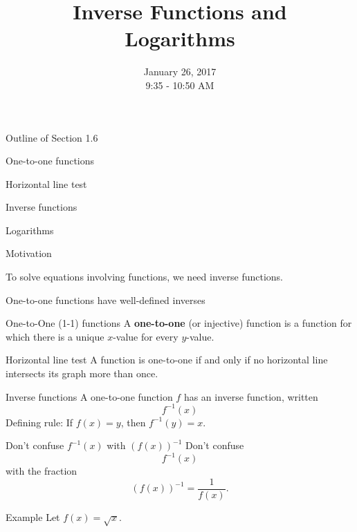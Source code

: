 \documentclass[t]{beamer}
\title{Inverse Functions and \\
Logarithms}
\date{January 26, 2017 \\ 9:35 - 10:50 AM}
\newenvironment{fpi}
  {\itemize[nolistsep,itemsep=\fill]}
  {\vfill\enditemize}
\begin{document}
\frame{\titlepage}


\begin{frame}{Outline of Section 1.6}
\begin{fpi}
\item One-to-one functions
\item Horizontal line test
\item Inverse functions
\item Logarithms
\end{fpi}
\end{frame}

\begin{frame}{Motivation}
\begin{fpi}
\item To solve equations involving functions, we need inverse functions.

\item One-to-one functions have well-defined inverses
\end{fpi}
\end{frame}

\begin{frame}{One-to-One (1-1) functions}
A \textbf{one-to-one} (or injective) function is a function for which there is a unique $x$-value for every $y$-value.
\end{frame}

\begin{frame}{Horizontal line test}
A function is one-to-one if and only if no horizontal line intersects its graph more than once.
\end{frame}

\begin{frame}{Inverse functions}
A one-to-one function $f$ has an inverse function, written
$$f^{-1}(x)$$
Defining rule: If $f(x) = y$, then $f^{-1}(y) = x$.
\end{frame}

\begin{frame}{Don't confuse $f^{-1}(x)$ with $(f(x))^{-1}$}
Don't confuse
$$f^{-1}(x)$$
with the fraction
$$(f(x))^{-1} = \frac{1}{f(x)}.$$
\end{frame}

\begin{frame}{Example}
Let $f(x) = \sqrt{x}$. 
\end{frame}

\begin{frame}{
The inverse function \emph{undoes} a function
$$ f (f^{-1}(x))  = x $$
and
$$ f^{-1} (f(x))  = x $$
\end{frame}
\end{document}

